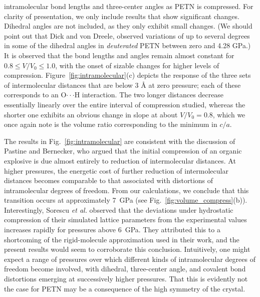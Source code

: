 \documentclass[prb,aps,nobibnotes,twocolumn,doublespace,twocolumngrid,superbib]{revtex4}
\begin{document}
intramolecular bond lengths and three-center angles as PETN is
compressed.  For clarity of presentation, we only include results that
show significant changes.
Dihedral angles are not included, as they only exhibit
small changes.  (We should point out that
Dick and von Dreele,\cite{Dick_1997} observed variations of up to 
several degrees in some of the dihedral angles in {\it deuterated} PETN
between zero and 4.28 GPa.)
It is observed that the bond lengths and angles remain almost constant
for $ 0.8 \leq V/V_0 \leq 1.0$, with the onset of sizable changes for
higher levels of compression.  Figure~\ref{fig:intramolecular}(c)
depicts the response of the three sets of intermolecular distances
that are below 3 \AA\/ at zero pressure; each of these corresponds to
an O$\cdot\cdot\cdot$H interaction.  The two longer distances decrease
essentially linearly over the entire interval of compression studied,
whereas the shorter one exhibits an obvious change in slope at about
$V/V_0=0.8$, which we once again note is the volume ratio
corresponding to the minimum in $c/a$.


The results in Fig.~\ref{fig:intramolecular} are consistent with the
discussion of Pastine and Bernecker,\cite{Pastine_1974v45} who argued
that the initial compression of an organic explosive is due almost
entirely to reduction of intermolecular distances.  At higher
pressures, the energetic cost of further reduction of intermolecular
distances becomes comparable to that associated with distortions of
intramolecular degrees of freedom.  From our calculations, we conclude
that this transition occurs at approximately 7~GPa (see
Fig.~\ref{fig:volume_compress}(b)).  Interestingly, Sorescu {\it et
al.}\cite{Sorescu_1999v103} observed that the deviations under
hydrostatic compression of their simulated lattice parameters from the
experimental values increases rapidly for pressures above 6~GPa.  They
attributed this to a shortcoming of the rigid-molecule approximation
used in their work, and the present results would seem to corroborate
this conclusion.  Intuitively, one might expect a range of pressures
over which different kinds of intramolecular degrees of freedom become
involved, with dihedral, three-center angle, and covalent bond
distortions emerging at successively higher pressures.  That this is
evidently not the case for PETN may be a consequence of the high
symmetry of the crystal.
\end{document}
